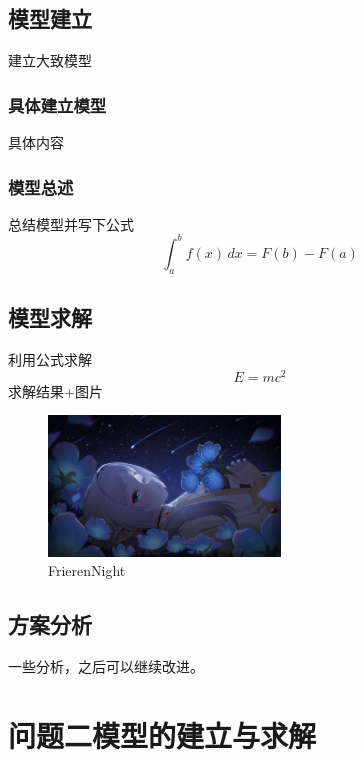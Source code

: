 \documentclass[12pt,a4paper]{article}
\numberwithin{figure}{subsection}
\numberwithin{figure}{subsection}
\begin{document}
\subsection{模型建立}
建立大致模型
\subsubsection{具体建立模型}
具体内容
\subsubsection{模型总述}
总结模型并写下公式
\begin{equation}
  \int_a^b f(x) \, dx = F(b) - F(a)
\end{equation}
\subsection{模型求解}
利用公式求解
\begin{equation}
  E=mc^2
\end{equation}
求解结果+图片
\begin{figure}[H]%
  \centering
  \includegraphics[width = 0.55\textwidth]{figures/Frieren_Night.jpg}
  \caption{FrierenNight}
  \label{img:Frieren_Night}    
\end{figure}

\subsection{方案分析}
一些分析，之后可以继续改进。

\section{问题二模型的建立与求解}
\end{document}

